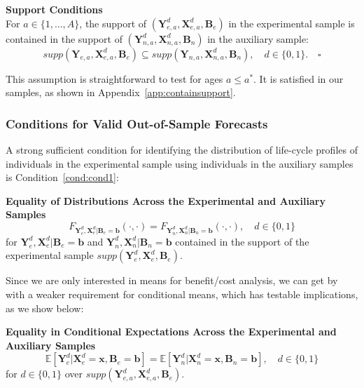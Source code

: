 \onehalfspacing
\begin{assumption} \label{ass:contain} \textbf{Support Conditions} \\
For $a \in \{ 1, \ldots, A \}$, the support of $\left( \bm{Y}^d_{e,a}, \bm{X}^d_{e,a}, \bm{B}_e \right)$ in the experimental sample is contained in the support of $\left( \bm{Y}^d_{n,a}, \bm{X}^d_{n,a}, \bm{B}_n \right)$ in the auxiliary sample:
\begin{equation}
supp( \bm{Y}_{e,a}, \bm{X}^d_{e,a}, \bm{B}_e ) \subseteq supp( \bm{Y}_{n,a}, \bm{X}^d_{n,a}, \bm{B}_n ), \quad d \in \{0,1\}. \quad \square
\end{equation}
\end{assumption}
\doublespacing
This assumption is straightforward to test for ages $a\leq a^\ast$. It is satisfied in our samples, as shown in Appendix~\ref{app:containsupport}.

\subsubsection{Conditions for Valid Out-of-Sample Forecasts}

\noindent A strong sufficient condition for identifying the distribution of life-cycle profiles of individuals in the experimental sample using individuals in the auxiliary samples is Condition~\ref{cond:cond1}:

\onehalfspacing
\begin{condition} \textbf{Equality of Distributions Across the Experimental and Auxiliary Samples \label{cond:cond1}}
\begin{equation}
F_{\bm{Y}_e^d, \bm{X}_e^d | \bm{B}_e = \bm{b}} \left( \cdot, \cdot \right) = F_{\bm{Y}_n^d, \bm{X}_n^d | \bm{B}_n = \bm{b}} \left( \cdot, \cdot \right), \quad d \in \{0,1\}
\end{equation}
\noindent for $\bm{Y}_e^d, \bm{X}^d_e | \bm{B}_e = \bm{b}$ and $\bm{Y}_n^d, \bm{X}^d_n | \bm{B}_n = \bm{b}$ contained in the support of the experimental sample $supp\left(\bm{Y}^d_{e}, \bm{X}^d_{e}, \bm{B}_{e} \right)$.
\end{condition}
\doublespacing

\noindent  Since we are only interested in means for benefit/cost analysis, we can get by with a weaker requirement for conditional means, which has testable implications, as we show below:

\onehalfspacing
\begin{condition} \textbf{Equality in Conditional Expectations Across the Experimental and Auxiliary Samples \label{cond:cond2}}
\begin{equation}
\mathbb{E} \left[ \bm{Y}_e^d |  \bm{X}_e^d = \bm{x}, \bm{B}_e = \bm{b} \right] = \mathbb{E} \left[ \bm{Y}_n^d |  \bm{X}_n^d = \bm{x}, \bm{B}_n = \bm{b} \right], \quad d \in \{0,1\}
\end{equation}
for $d \in \{0, 1 \}$ over $supp\left(\bm{Y}^d_{e,a}, \bm{X}^d_{e,a}, \bm{B}_e\right)$.
\end{condition}
\doublespacing

